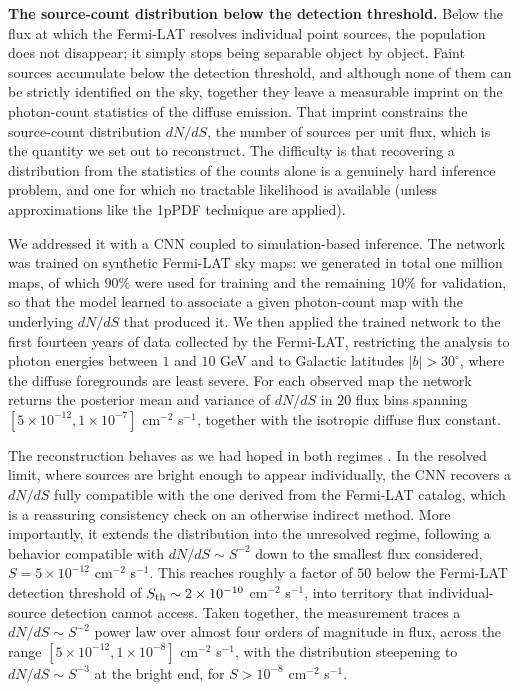 \textbf{The source-count distribution below the detection threshold.} Below the flux at which the Fermi-LAT resolves individual point sources, the population does not disappear; it simply stops being separable object by object. Faint sources accumulate below the detection threshold, and although none of them can be strictly identified on the sky, together they leave a measurable imprint on the photon-count statistics of the diffuse emission. That imprint constrains the source-count distribution $dN/dS$, the number of sources per unit flux, which is the quantity we set out to reconstruct. The difficulty is that recovering a distribution from the statistics of the counts alone is a genuinely hard inference problem, and one for which no tractable likelihood is available (unless approximations like the 1pPDF technique are applied).

We addressed it with a CNN coupled to simulation-based inference. The network was trained on synthetic Fermi-LAT sky maps: we generated in total one million maps, of which $90\%$ were used for training and the remaining $10\%$ for validation, so that the model learned to associate a given photon-count map with the underlying $dN/dS$ that produced it. We then applied the trained network to the first fourteen years of data collected by the Fermi-LAT, restricting the analysis to photon energies between $1$ and $10$ GeV and to Galactic latitudes $|b| > 30^\circ$, where the diffuse foregrounds are least severe. For each observed map the network returns the posterior mean and variance of $dN/dS$ in $20$ flux bins spanning $[5\times10^{-12}, 1\times10^{-7}]$ cm$^{-2}$ s$^{-1}$, together with the isotropic diffuse flux constant.

The reconstruction behaves as we had hoped in both regimes \cite{Amerio:2023uet}. In the resolved limit, where sources are bright enough to appear individually, the CNN recovers a $dN/dS$ fully compatible with the one derived from the Fermi-LAT catalog, which is a reassuring consistency check on an otherwise indirect method. More importantly, it extends the distribution into the unresolved regime, following a behavior compatible with $dN/dS \sim S^{-2}$ down to the smallest flux considered, $S = 5\times10^{-12}$ cm$^{-2}$ s$^{-1}$. This reaches roughly a factor of $50$ below the Fermi-LAT detection threshold of $S_{\rm th} \sim 2\times10^{-10}$ cm$^{-2}$ s$^{-1}$, into territory that individual-source detection cannot access. Taken together, the measurement traces a $dN/dS \sim S^{-2}$ power law over almost four orders of magnitude in flux, across the range $[5\times10^{-12}, 1\times10^{-8}]$ cm$^{-2}$ s$^{-1}$, with the distribution steepening to $dN/dS \sim S^{-3}$ at the bright end, for $S > 10^{-8}$ cm$^{-2}$ s$^{-1}$.

